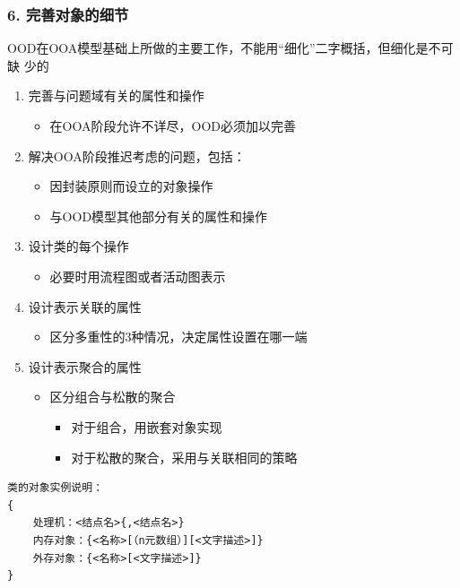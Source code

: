 \documentclass[compress]{beamer}
\begin{document}
\begin{frame}
  \frametitle{6. 完善对象的细节}
  OOD在OOA模型基础上所做的主要工作，不能用“细化”二字概括，但细化是不可缺
  少的

   {
  \begin{enumerate}
    \item 完善与问题域有关的属性和操作
      \begin{itemize}
        \item 在OOA阶段允许不详尽，OOD必须加以完善
      \end{itemize}
    \item 解决OOA阶段推迟考虑的问题，包括：
      \begin{itemize}
        \item 因封装原则而设立的对象操作
        \item 与OOD模型其他部分有关的属性和操作
      \end{itemize}
    \item 设计类的每个操作
      \begin{itemize}
        \item 必要时用流程图或者活动图表示
      \end{itemize}
  \end{enumerate}
}

   {
    \begin{enumerate}
        \setcounter{enumi}{3}
    \item 设计表示关联的属性
      \begin{itemize}
        \item 区分多重性的3种情况，决定属性设置在哪一端
      \end{itemize}
    \item 设计表示聚合的属性
      \begin{itemize}
        \item 区分组合与松散的聚合
          \begin{itemize}
            \item 对于组合，用嵌套对象实现
            \item 对于松散的聚合，采用与关联相同的策略
          \end{itemize}
      \end{itemize}
  \end{enumerate}
}
\end{frame}

\newsavebox{\ooinstancebox}
\begin{lrbox}{\ooinstancebox}
\begin{lstlisting}
类的对象实例说明：
{
    处理机：<结点名>{,<结点名>}
    内存对象：{<名称>[（n元数组）][<文字描述>]}
    外存对象：{<名称>[<文字描述>]}
}
\end{lstlisting}
\end{lrbox}
\end{document}
